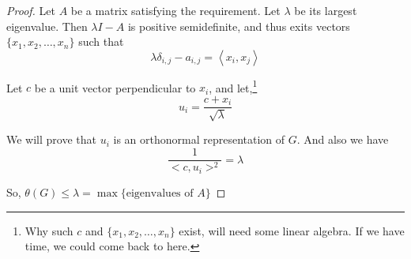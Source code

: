 \documentclass{beamer}
\begin{document}
                  \begin{frame}
                        \begin{proof}
                              Let $A$ be a matrix satisfying the requirement. Let $\lambda$ be its largest eigenvalue.
                              Then $\lambda I -A$ is positive semidefinite, and thus exits vectors $\{x_{1},x_{2},\dots,x_{n}\}$ such that
                              \begin{equation}
                                    \lambda\delta_{i,j} - a_{i,j} = \left<x_{i},x_{j}\right>
                              \end{equation}

                              Let $c$ be a unit vector perpendicular to $x_{i}$, and let,\footnote{
                                    Why such $c$ and $\{x_{1},x_{2},\dots,x_{n}\}$ exist, will need some linear algebra. If we have time, we could come back to here.
                              }
                              \begin{equation}
                                    u_{i} = \frac{c+x_{i}}{\sqrt{\lambda}}
                              \end{equation}

                              We will prove that $u_{i}$ is an orthonormal representation of $G$. And also we have 
                              \begin{equation}
                                    \frac{1}{<c,u_{i}>^{2}} = \lambda
                              \end{equation}

                              So, \begin{math}
                                    \theta(G) \le \lambda = \max\{\text{eigenvalues of $A$}\}
                              \end{math}
                        \end{proof}
                  \end{frame}
\end{document}
